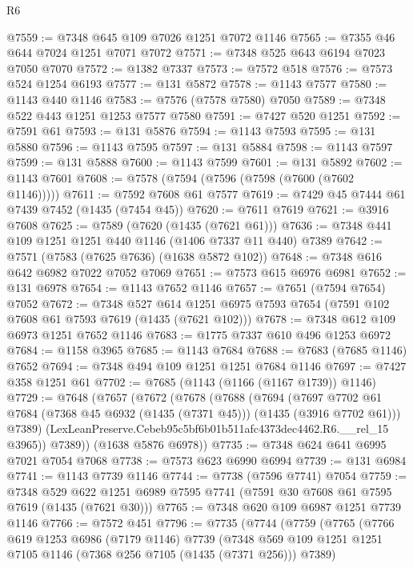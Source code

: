 \begin{lexlean}{R6}
\begin{coremodule}
@7559 := @7348 @645 @109 @7026 @1251 @7072 @1146
@7565 := @7355 @46 @644 @7024 @1251 @7071 @7072
@7571 := @7348 @525 @643 @6194 @7023 @7050 @7070
@7572 := @1382 @7337
@7573 := @7572 @518
@7576 := @7573 @524 @1254 @6193
@7577 := @131 @5872
@7578 := @1143 @7577
@7580 := @1143 @440 @1146
@7583 := @7576 (@7578 @7580) @7050
@7589 := @7348 @522 @443 @1251 @1253 @7577 @7580
@7591 := @7427 @520 @1251
@7592 := @7591 @61
@7593 := @131 @5876
@7594 := @1143 @7593
@7595 := @131 @5880
@7596 := @1143 @7595
@7597 := @131 @5884
@7598 := @1143 @7597
@7599 := @131 @5888
@7600 := @1143 @7599
@7601 := @131 @5892
@7602 := @1143 @7601
@7608 := @7578 (@7594 (@7596 (@7598 (@7600 (@7602 @1146)))))
@7611 := @7592 @7608 @61 @7577
@7619 := @7429 @45 @7444 @61 @7439 @7452 (@1435 (@7454 @45))
@7620 := @7611 @7619
@7621 := @3916 @7608
@7625 := @7589 (@7620 (@1435 (@7621 @61)))
@7636 := @7348 @441 @109 @1251 @1251 @440 @1146 (@1406 @7337 @11 @440) @7389
@7642 := @7571 (@7583 (@7625 @7636) (@1638 @5872 @102))
@7648 := @7348 @616 @642 @6982 @7022 @7052 @7069
@7651 := @7573 @615 @6976 @6981
@7652 := @131 @6978
@7654 := @1143 @7652 @1146
@7657 := @7651 (@7594 @7654) @7052
@7672 := @7348
    @527
    @614
    @1251
    @6975
    @7593
    @7654
    (@7591 @102 @7608 @61 @7593 @7619 (@1435 (@7621 @102)))
@7678 := @7348 @612 @109 @6973 @1251 @7652 @1146
@7683 := @1775 @7337 @610 @496 @1253 @6972
@7684 := @1158 @3965
@7685 := @1143 @7684
@7688 := @7683 (@7685 @1146) @7652
@7694 := @7348 @494 @109 @1251 @1251 @7684 @1146
@7697 := @7427 @358 @1251 @61
@7702 := @7685 (@1143 (@1166 (@1167 @1739)) @1146)
@7729 := @7648
    (@7657
      (@7672
        (@7678
          (@7688
            (@7694
              (@7697
                @7702
                @61
                @7684
                (@7368 @45 @6932 (@1435 (@7371 @45)))
                (@1435 (@3916 @7702 @61)))
              @7389)
            (LexLeanPreserve.Cebeb95c5bf6b01b511afc4373dec4462.R6.__rel_15 @3965))
          @7389))
      (@1638 @5876 @6978))
@7735 := @7348 @624 @641 @6995 @7021 @7054 @7068
@7738 := @7573 @623 @6990 @6994
@7739 := @131 @6984
@7741 := @1143 @7739 @1146
@7744 := @7738 (@7596 @7741) @7054
@7759 := @7348
    @529
    @622
    @1251
    @6989
    @7595
    @7741
    (@7591 @30 @7608 @61 @7595 @7619 (@1435 (@7621 @30)))
@7765 := @7348 @620 @109 @6987 @1251 @7739 @1146
@7766 := @7572 @451
@7796 := @7735
    (@7744
      (@7759
        (@7765
          (@7766
            @619
            @1253
            @6986
            (@7179 @1146)
            @7739
            (@7348 @569 @109 @1251 @1251 @7105 @1146 (@7368 @256 @7105 (@1435 (@7371 @256))) @7389)

\end{coremodule}
\end{lexlean}
